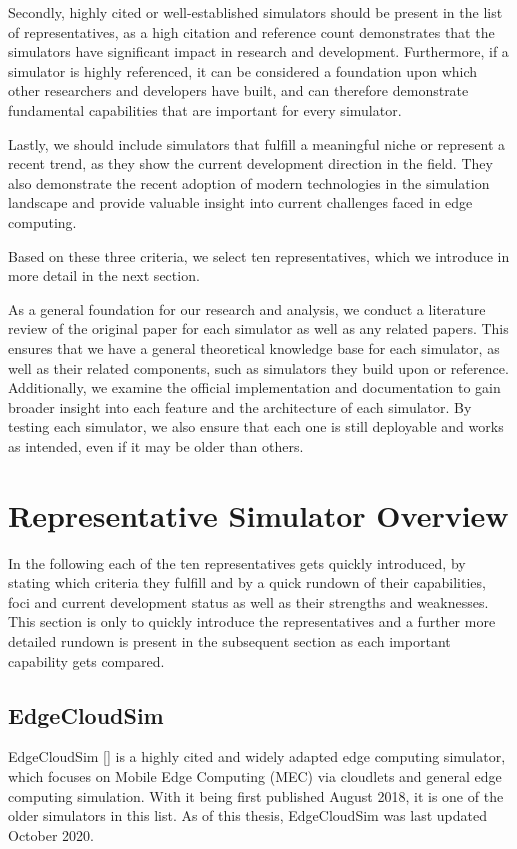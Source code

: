 Secondly, highly cited or well-established simulators should be present in the list of representatives, as a high citation and reference count demonstrates that the simulators have significant impact in research and development.
Furthermore, if a simulator is highly referenced, it can be considered a foundation upon which other researchers and developers have built, and can therefore demonstrate fundamental capabilities that are important for every simulator.

Lastly, we should include simulators that fulfill a meaningful niche or represent a recent trend, as they show the current development direction in the field.
They also demonstrate the recent adoption of modern technologies in the simulation landscape and provide valuable insight into current challenges faced in edge computing.

Based on these three criteria, we select ten representatives, which we introduce in more detail in the next section.

As a general foundation for our research and analysis, we conduct a literature review of the original paper for each simulator as well as any related papers.
This ensures that we have a general theoretical knowledge base for each simulator, as well as their related components, such as simulators they build upon or reference.
Additionally, we examine the official implementation and documentation to gain broader insight into each feature and the architecture of each simulator.
By testing each simulator, we also ensure that each one is still deployable and works as intended, even if it may be older than others.

\section{Representative Simulator Overview}
In the following each of the ten representatives gets quickly introduced, by stating which criteria they fulfill and by a quick rundown of their capabilities, foci and current development status as well as their strengths and weaknesses.
This section is only to quickly introduce the representatives and a further more detailed rundown is present in the subsequent section as each important capability gets compared.
\subsection{EdgeCloudSim}
EdgeCloudSim [\cite{sim-edgecloudsim}] is a highly cited and widely adapted edge computing simulator, which focuses on Mobile Edge Computing (MEC) via cloudlets and general edge computing simulation.
With it being first published August 2018, it is one of the older simulators in this list. As of this thesis, EdgeCloudSim was last updated October 2020.

